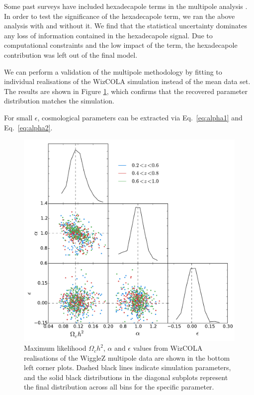 \documentclass[a4paper,fleqn,usenatbib]{mnras}
\begin{document}
Some past surveys have included hexadecapole terms in the multipole analysis \citep{XuCuesta2013}. In order to test the significance of the hexadecapole term, we ran the above analysis with and without it. We find that the statistical uncertainty dominates any loss of information contained in the hexadecapole signal. Due to computational constraints and the low impact of the term, the hexadecapole contribution was left out of the final model.


We can perform a validation of the multipole methodology by fitting to individual realisations of the WizCOLA simulation instead of the mean data set. 
The results are shown in Figure \ref{fig:mpDist2}, which confirms that the recovered parameter distribution matches the simulation.  

For small $\epsilon$, cosmological parameters can be extracted via Eq.~\ref{eq:alpha1} and Eq.~\ref{eq:alpha2}.

\begin{figure}
	\begin{center}
		\includegraphics[width=\columnwidth]{mpDist2.pdf}
	\end{center}
	\caption{Maximum likelihood $\Omega_c h^2$, $\alpha$ and $\epsilon$ values from WizCOLA realisations of the WiggleZ multipole data are shown in the bottom left corner plots. Dashed black lines indicate simulation parameters, and the solid black distributions in the diagonal subplots represent the final distribution across all bins for the specific parameter.}
	\label{fig:mpDist2}
\end{figure}
\end{document}
